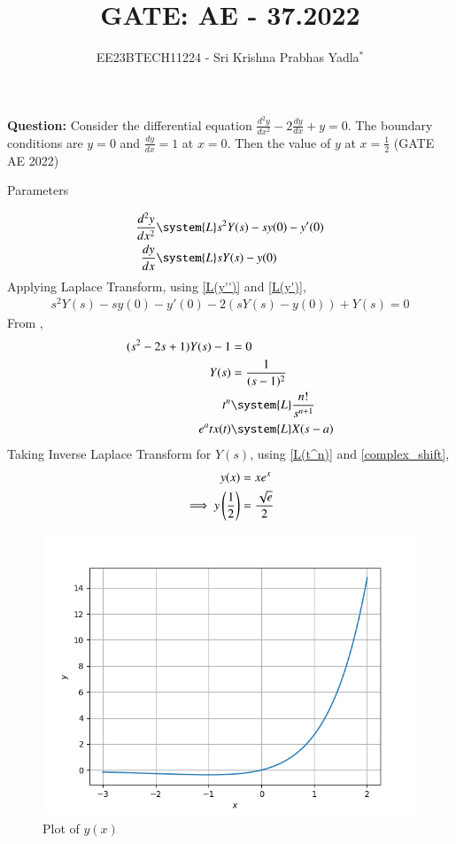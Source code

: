 \documentclass[journal,12pt,twocolumn]{IEEEtran}
\theoremstyle{remark}
\begin{document}

\vspace{3cm}

\title{GATE: AE - 37.2022}
\author{EE23BTECH11224 - Sri Krishna Prabhas Yadla$^{*}$%
}
\maketitle
\newpage
\bigskip

\renewcommand{\thefigure}{\arabic{figure}}
\renewcommand{\thetable}{\arabic{table}}


\vspace{3cm}
\textbf{Question:} Consider the differential equation $\frac{d^2y}{dx^2}-2\frac{dy}{dx}+y=0$. The boundary conditions are $y=0$ and $\frac{dy}{dx}=1$ at $x=0$. Then the value of $y$ at $x=\frac{1}{2}$ \hfill (GATE AE 2022)\\
\solution
\begin{table}[htbp]
	\centering
	\def\arraystretch{1.5}
	
	\caption{Parameters}
	\label{tab:parameters}
\end{table}
\begin{align}
\label{L(y'')}\frac{d^2y}{dx^2} &\system{L} s^2Y(s)-sy(0)-y'(0)\\
\label{L(y')}\frac{dy}{dx} &\system{L} sY(s)-y(0)
\end{align}
Applying Laplace Transform, using \eqref{L(y'')} and \eqref{L(y')},
\begin{align}
s^2Y(s)-sy(0)-y'(0) - 2(sY(s)-y(0)) + Y(s) = 0
\end{align}
From ,
\begin{align}
(s^2-2s+1)Y(s)-1 &= 0 \\
Y(s) &= \frac{1}{(s-1)^2}\\
\label{L(t^n)}t^n &\system{L} \frac{n!}{s^{n+1}}\\
\label{complex_shift}e^at x(t) &\system{L} X(s-a)
\end{align}
Taking Inverse Laplace Transform for $Y(s)$, using \eqref{L(t^n)} and \eqref{complex_shift},
\begin{align}
y(x) &= xe^x \\
\implies y\left(\frac{1}{2}\right) &= \frac{\sqrt{e}}{2}
\end{align}
\begin{figure}[htbp]
	\includegraphics[width=\columnwidth]{figs/plot.png}
	\caption{Plot of $y(x)$}
	\label{fig:plot}
\end{figure}
\end{document}
